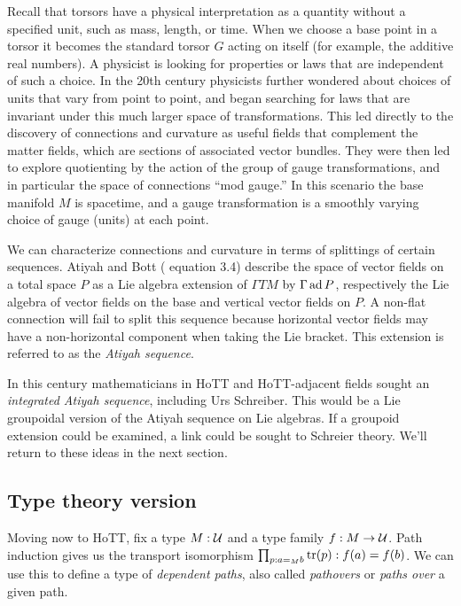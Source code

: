 \begin{mynote}
Recall that torsors have a physical interpretation as a quantity without a specified unit, such as mass, length, or time. When we choose a base point in a torsor it becomes the standard torsor \( G \) acting on itself (for example, the additive real numbers). A physicist is looking for properties or laws that are independent of such a choice. In the 20th century physicists further wondered about choices of units that vary from point to point, and began searching for laws that are invariant under this much larger space of transformations. This led directly to the discovery of connections and curvature as useful fields that complement the matter fields, which are sections of associated vector bundles. They were then led to explore quotienting by the action of the group of gauge transformations, and in particular the space of connections ``mod gauge.'' In this scenario the base manifold \( M \) is spacetime, and a gauge transformation is a smoothly varying choice of gauge (units) at each point.
\end{mynote}

We can characterize connections and curvature in terms of splittings of certain sequences. Atiyah and Bott (\cite{atiyah1983yang} equation 3.4) describe the space of vector fields on a total space \( P \) as a Lie algebra extension of \( \Gamma TM \) by \( \Gamma \operatorname{ad} P \), respectively the Lie algebra of vector fields on the base and vertical vector fields on \( P \). A non-flat connection will fail to split this sequence because horizontal vector fields may have a non-horizontal component when taking the Lie bracket. This extension is referred to as the \emph{Atiyah sequence}. 

In this century mathematicians in HoTT and HoTT-adjacent fields sought an \emph{integrated Atiyah sequence}, including Urs Schreiber\cite{urs_atiyah}\cite{urs_atiyah_blog}. This would be a Lie groupoidal version of the Atiyah sequence on Lie algebras. If a groupoid extension could be examined, a link could be sought to Schreier theory. We'll return to these ideas in the next section.

\subsection{Type theory version}

Moving now to HoTT, fix a type \( M:\mathcal{U} \) and a type family \( f:M\to\mathcal{U} \). Path induction gives us the transport isomorphism \( \prod_{p:a=_M b}\mathrm{tr}(p):f(a)=f(b) \). We can use this to define a type of \emph{dependent paths}, also called \emph{pathovers} or \emph{paths over} a given path.

